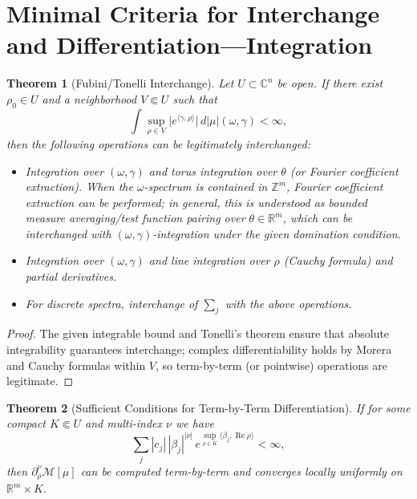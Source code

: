 \documentclass[11pt,a4paper]{article}
\newtheorem{theorem}{Theorem}[section]
\theoremstyle{remark}
\DeclareMathOperator{\Re}{Re}
\begin{document}
\section{Minimal Criteria for Interchange and Differentiation---Integration}\label{sec:diff}

\begin{theorem}[Fubini/Tonelli Interchange]\label{thm:fubini}
Let $U\subset\mathbb{C}^n$ be open. If there exist $\rho_0\in U$ and a neighborhood $V\Subset U$ such that
\begin{equation}
\int \sup_{\rho\in V}\bigl|e^{\langle\gamma,\rho\rangle}\bigr|\,d|\mu|(\omega,\gamma)<\infty,
\end{equation}
then the following operations can be legitimately interchanged:
\begin{itemize}
\item Integration over $(\omega,\gamma)$ and torus integration over $\theta$ (or Fourier coefficient extraction). When the $\omega$-spectrum is contained in $\mathbb{Z}^m$, Fourier coefficient extraction can be performed; in general, this is understood as bounded measure averaging/test function pairing over $\theta\in\mathbb{R}^m$, which can be interchanged with $(\omega,\gamma)$-integration under the given domination condition.
\item Integration over $(\omega,\gamma)$ and line integration over $\rho$ (Cauchy formula) and partial derivatives.
\item For discrete spectra, interchange of $\sum_j$ with the above operations.
\end{itemize}
\end{theorem}

\begin{proof}
The given integrable bound and Tonelli's theorem ensure that absolute integrability guarantees interchange; complex differentiability holds by Morera and Cauchy formulas within $V$, so term-by-term (or pointwise) operations are legitimate.
\end{proof}

\begin{theorem}[Sufficient Conditions for Term-by-Term Differentiation]\label{thm:termwise}
If for some compact $K\Subset U$ and multi-index $\nu$ we have
\begin{equation}
\sum_j |c_j|\,|\beta_j|^{|\nu|}\,e^{\sup_{\rho\in K}\langle\beta_j,\Re\rho\rangle}<\infty,
\end{equation}
then $\partial_{\rho}^{\nu}\mathcal{M}[\mu]$ can be computed term-by-term and converges locally uniformly on $\mathbb{R}^m\times K$.
\end{theorem}
\end{document}
